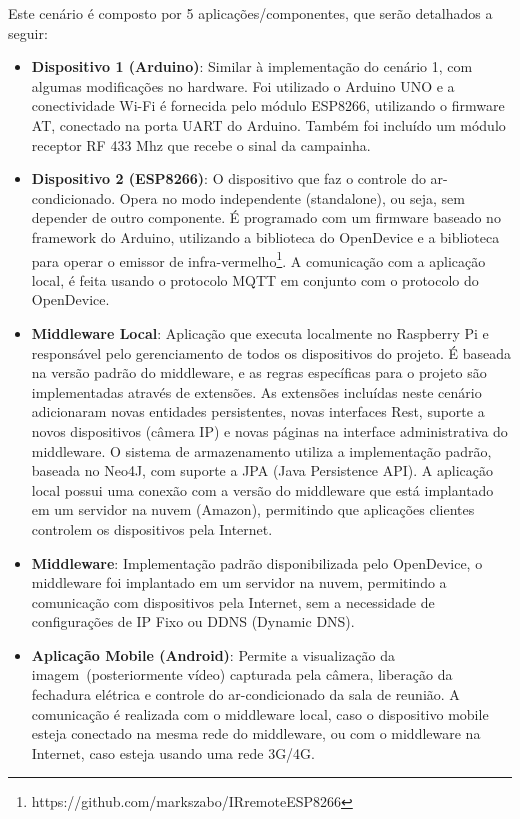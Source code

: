 Este cenário é composto por 5 aplicações/componentes, que serão detalhados
a seguir:
\begin{itemize}
\item \textbf{Dispositivo 1 (Arduino)}: Similar à implementação do cenário
1, com algumas modificações no hardware. Foi utilizado o Arduino UNO
e a conectividade Wi-Fi é fornecida pelo módulo ESP8266, utilizando
o firmware AT, conectado na porta UART do Arduino. Também foi incluído
um módulo receptor RF 433 Mhz que recebe o sinal da campainha. 
\item \textbf{Dispositivo 2 (ESP8266)}: O dispositivo que faz o controle
do ar-condicionado. Opera no modo independente (standalone), ou seja,
sem depender de outro componente. É programado com um firmware baseado
no framework do Arduino\cite{esp8266:arduino}, utilizando a biblioteca
do OpenDevice e a biblioteca para operar o emissor de infra-vermelho\footnote{https://github.com/markszabo/IRremoteESP8266}.
A comunicação com a aplicação local, é feita usando o protocolo MQTT
em conjunto com o protocolo do OpenDevice.
\item \textbf{Middleware Local}: Aplicação que executa localmente no Raspberry
Pi e responsável pelo gerenciamento de todos os dispositivos do projeto.
É baseada na versão padrão do middleware, e as regras específicas
para o projeto são implementadas através de extensões. As extensões
incluídas neste cenário adicionaram novas entidades persistentes,
novas interfaces Rest, suporte a novos dispositivos (câmera IP) e
novas páginas na interface administrativa do middleware. O sistema
de armazenamento utiliza a implementação padrão, baseada no Neo4J,
com suporte a JPA (Java Persistence API). A aplicação local possui
uma conexão com a versão do middleware que está implantado em um servidor
na nuvem (Amazon), permitindo que aplicações clientes controlem os
dispositivos pela Internet. 
\item \textbf{Middleware}: Implementação padrão disponibilizada pelo OpenDevice,
o middleware foi implantado em um servidor na nuvem, permitindo a
comunicação com dispositivos pela Internet, sem a necessidade de configurações
de IP Fixo ou DDNS (Dynamic DNS).
\item \textbf{Aplicação Mobile (Android)}: Permite a visualização da imagem~(posteriormente
vídeo) capturada pela câmera, liberação da fechadura elétrica e controle
do ar-condicionado da sala de reunião. A comunicação é realizada com
o middleware local, caso o dispositivo mobile esteja conectado na
mesma rede do middleware, ou com o middleware na Internet, caso esteja
usando uma rede 3G/4G.
\end{itemize}

